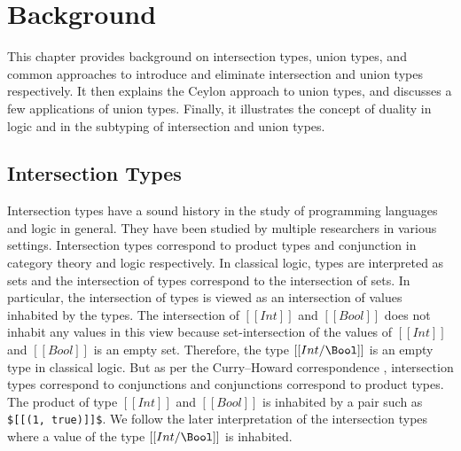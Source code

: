 
\chapter{Background}
\label{chap:background}

This chapter provides background on intersection types, 
union types, and common approaches to introduce and eliminate 
intersection and union types respectively. It then explains 
the Ceylon approach to union types, and discusses a few 
applications of union types. Finally, it illustrates the concept of 
duality in logic and
in the subtyping of intersection and union types.







\section{Intersection Types}

Intersection types have a sound history in the study of 
programming languages and logic in general.
They have been studied by multiple researchers
\citep{barbanera1995intersection,dunfield2014elaborating,muehlboeck2018empowering,pierce2002programming}
in various settings. Intersection types correspond to 
product types and conjunction in category theory and
logic respectively. In classical logic, types are 
interpreted as sets and the intersection of types 
correspond to the intersection of sets.
In particular, the intersection of types is viewed as
an intersection of values inhabited by the types.
The intersection of $[[Int]]$ and $[[Bool]]$ does not
inhabit any values in this view because set-intersection
of the values of $[[Int]]$ and $[[Bool]]$ is an empty set.
Therefore, the type $[[Int/\Bool]]$ is an empty type
in classical logic. But as per the Curry–Howard correspondence
\citep{curry1958combinatory, howard1980formulae},
intersection types correspond to conjunctions and conjunctions
correspond to product types. The product of type $[[Int]]$
and $[[Bool]]$ is inhabited by a pair such as
\lstinline{$[[(1, true)]]$}.
We follow the later interpretation of the intersection types
where a value of the type $[[Int/\Bool]]$ is inhabited.

